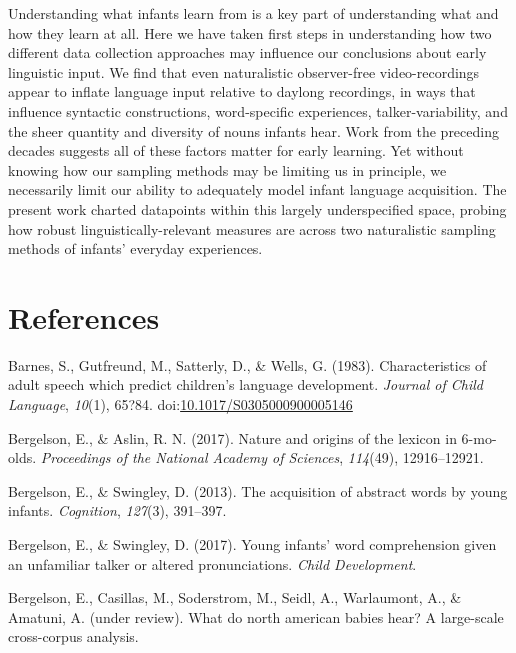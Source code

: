 \documentclass[floatsintext,man]{apa6}
\theoremstyle{definition}
\theoremstyle{definition}
\theoremstyle{definition}
\theoremstyle{remark}
\begin{document}
Understanding what infants learn from is a key part of understanding
what and how they learn at all. Here we have taken first steps in
understanding how two different data collection approaches may influence
our conclusions about early linguistic input. We find that even
naturalistic observer-free video-recordings appear to inflate language
input relative to daylong recordings, in ways that influence syntactic
constructions, word-specific experiences, talker-variability, and the
sheer quantity and diversity of nouns infants hear. Work from the
preceding decades suggests all of these factors matter for early
learning. Yet without knowing how our sampling methods may be limiting
us in principle, we necessarily limit our ability to adequately model
infant language acquisition. The present work charted datapoints within
this largely underspecified space, probing how robust
linguistically-relevant measures are across two naturalistic sampling
methods of infants' everyday experiences.

\newpage

\hypertarget{references}{%
\section{References}\label{references}}

\setlength{\parindent}{-0.5in}\setlength{\leftskip}{0.5in}

\hypertarget{refs}{}
\leavevmode\hypertarget{ref-barnes1983characteristics}{}%
Barnes, S., Gutfreund, M., Satterly, D., \& Wells, G. (1983).
Characteristics of adult speech which predict children's language
development. \emph{Journal of Child Language}, \emph{10}(1), 65?84.
doi:\href{https://doi.org/10.1017/S0305000900005146}{10.1017/S0305000900005146}

\leavevmode\hypertarget{ref-bergelson2017nature}{}%
Bergelson, E., \& Aslin, R. N. (2017). Nature and origins of the lexicon
in 6-mo-olds. \emph{Proceedings of the National Academy of Sciences},
\emph{114}(49), 12916--12921.

\leavevmode\hypertarget{ref-bergelson2013acquisition}{}%
Bergelson, E., \& Swingley, D. (2013). The acquisition of abstract words
by young infants. \emph{Cognition}, \emph{127}(3), 391--397.

\leavevmode\hypertarget{ref-bergelson2017young}{}%
Bergelson, E., \& Swingley, D. (2017). Young infants' word comprehension
given an unfamiliar talker or altered pronunciations. \emph{Child
Development}.

\leavevmode\hypertarget{ref-bergelsonunderreview}{}%
Bergelson, E., Casillas, M., Soderstrom, M., Seidl, A., Warlaumont, A.,
\& Amatuni, A. (under review). What do north american babies hear? A
large-scale cross-corpus analysis.
\end{document}
